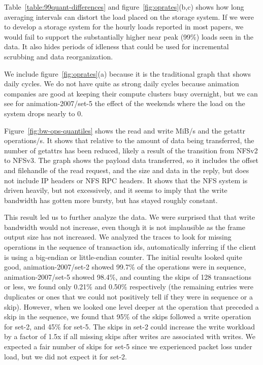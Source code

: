 Table~\ref{table:99quant-differences} and
figure~\ref{fig:oprates}(b,c) shows how long averaging intervals
can distort the load placed on the storage system.  If we were to
develop a storage system for the hourly loads reported in most papers,
we would fail to support the substantially higher near peak (99\%)
loads seen in the data.  It also hides periods of idleness
that could be used for incremental scrubbing and data reorganization.

We include figure~\ref{fig:oprates}(a) because it is the traditional
graph that shows daily cycles.  We do not have quite as strong daily
cycles because animation companies are good at keeping their compute
clusters busy overnight, but we can see for animation-2007/set-5 the effect of
the weekends where the load on the system drops nearly to 0.

Figure~\ref{fig:bw-ops-quantiles} shows the read and write MiB/s and the
getattr operations/s.  It shows that relative to the amount of data
being transferred, the number of getattrs has been reduced, likely a
result of the transition from NFSv2 to NFSv3.  The graph shows the
payload data transferred, so it includes the offset and filehandle of
the read request, and the size and data in the reply, but does not
include IP headers or NFS RPC headers.  It shows that the NFS system
is driven heavily, but not excessively, and it seems to imply that the
write bandwidth has gotten more bursty, but has stayed roughly
constant.  

This result led us to further analyze the data.  We were surprised
that that write bandwidth would not increase, even though it is not
implausible as the frame output size has not increased.  We analyzed
the traces to look for missing operations in the sequence of
transaction ids, automatically inferring if the client is using a
big-endian or little-endian counter.  The initial results looked quite
good, animation-2007/set-2 showed 99.7\% of the operations were in sequence,
animation-2007/set-5 showed 98.4\%, and counting the skips of 128 transactions
or less, we found only 0.21\% and 0.50\% respectively (the remaining
entries were duplicates or ones that we could not positively tell if
they were in sequence or a skip).  However, when we looked one level
deeper at the operation that preceded a skip in the sequence, we found
that 95\% of the skips followed a write operation for set-2, and 45\%
for set-5.  The skips in set-2 could increase the write workload by a
factor of 1.5x if all missing skips after writes are associated with
writes.  We expected a fair number of skips for set-5 since we
experienced packet loss under load, but we did not expect it for
set-2.


